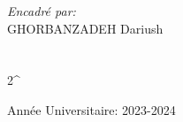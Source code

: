 \begin{titlepage}





\vskip0.1cm
 



\textit{Encadré par:}\\[0.7cm]
     \textsc{GHORBANZADEH} Dariush\\
     \\    \vspace*{0.5cm}\\






{\large  2^{} }

 
{\large Année Universitaire: 2023-2024}\\[3cm] 



\vfill %

\end{titlepage}
%